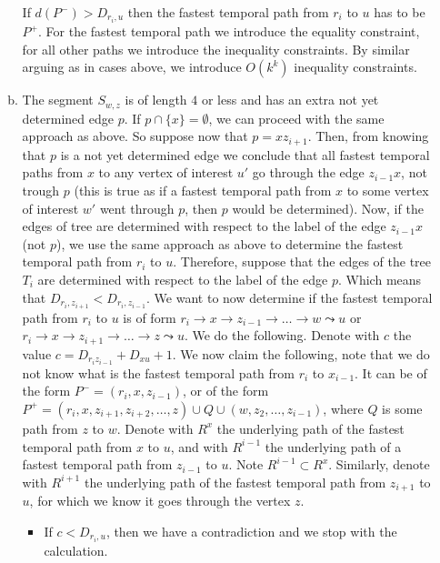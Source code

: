\documentclass[11pt,a4paper]{article}
\theoremstyle{remark}
\theoremstyle{definition}
\begin{document}
\begin{enumerate}[(i)]
\begin{enumerate}[(a)]
        If $d(P^{-}) > D_{r_i,u} $ then the fastest temporal path from $r_i$ to $u$ has to be $P^{+}$.
        For the fastest temporal path we introduce the equality constraint, 
        for all other paths we introduce the inequality constraints.
        By similar arguing as in cases above, we introduce $O(k^k)$ inequality constraints.
        \item The segment $S_{w,z}$ is of length $4$ or less
        and has an extra not yet determined edge $p$. 
        If $p \cap \{x\} = \emptyset$, 
        we can proceed with the same approach as above.
        So suppose now that $p = x z_{i+1}$.  
        Then, from knowing that $p$ is a not yet determined edge we conclude that
        all fastest temporal paths from $x$ to any vertex of interest $u'$ go through the edge $z_{i-1}x$, not trough $p$ 
        (this is true as if a fastest temporal path from $x$ to some vertex of interest $w'$ went through $p$, then $p$ would be determined).
        Now, if the edges of tree are determined with respect to the label of the edge $z_{i-1}x$ (not $p$),
        we use the same approach as above to determine the fastest temporal path from $r_i$ to $u$.
        Therefore, suppose that the edges of the tree $T_i$ are determined with respect to the label of the edge $p$.
        Which means that $D_{r_i, z_{i+1}} < D_{r_i, z_{i-1}}$.
        We want to now determine if the fastest temporal path from $r_i$ to $u$ is of form 
        $r_i \rightarrow x \rightarrow z_{i-1} \rightarrow \dots \rightarrow w \leadsto u$ or
        $r_i \rightarrow x \rightarrow z_{i+1} \rightarrow \dots \rightarrow z \leadsto u$.
        We do the following.
        Denote with $c$ the value $c = D_{r_i z_{i-1}} + D_{x u} + 1$.
        We now claim the following, note that we do not know what is the fastest temporal path from $r_i$ to $x_{i-1}$. 
        It can be of the form $P^- = (r_i,x,z_{i-1})$,
        or of the form $P^+ = (r_i,x, z_{i+1}, z_{i+2}, \dots, z) \cup Q \cup (w, z_2, \dots, z_{i-1})$, where $Q$ is some path from $z$ to $w$.
        Denote with $R^x$ the underlying path of the fastest temporal path from $x$ to $u$,
        and with $R^{i-1}$ the underlying path of a fastest temporal path from $z_{i-1}$ to $u$.
        Note $R^{i-1} \subset R^x$.
        Similarly,
        denote with $R^{i+1}$ the underlying path of the fastest temporal path from $z_{i+1}$ to $u$, 
        for which we know it goes through the vertex $z$.
        \begin{itemize}
            \item  If $c < D_{r_i,u}$, then we have a contradiction and we stop with the calculation.\\

\end{itemize}
\end{enumerate}
\end{enumerate}
\end{document}
